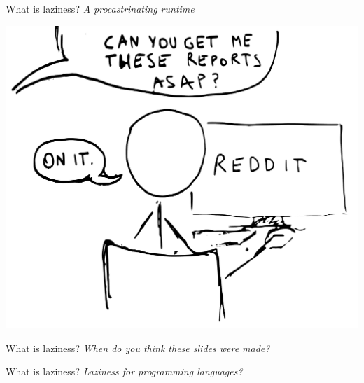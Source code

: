 \documentclass[20pt]{beamer}
\begin{document}
\begin{frame}{What is laziness?}
    \textit{A procastrinating runtime}
\end{frame}

\begin{frame}[plain]
    \begin{center}
    \includegraphics[height=0.9\textheight]{images/reddit.pdf}
    \end{center}
\end{frame}

\begin{frame}{What is laziness?}
    \textit{When do you think \newline these slides were made?}
\end{frame}

\begin{frame}{What is laziness?}
    \textit{Laziness for programming languages?}
\end{frame}
\end{document}

